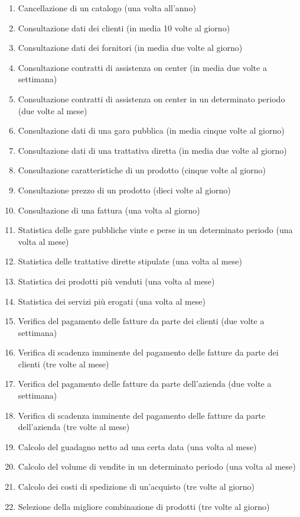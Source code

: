 \begin{enumerate}
  \item Cancellazione di un catalogo (una volta all'anno)
  \item Consultazione dati dei clienti (in media 10 volte al giorno)
  \item Consultazione dati dei fornitori (in media due volte al giorno)
  \item Consultazione contratti di assistenza on center (in media due volte a settimana)
  \item Consultazione contratti di assistenza on center in un determinato periodo (due volte al mese)
  \item Consultazione dati di una gara pubblica (in media cinque volte al giorno)
  \item Consultazione dati di una trattativa diretta (in media due volte al giorno)
  \item Consultazione caratteristiche di un prodotto (cinque volte al giorno)
  \item Consultazione prezzo di un prodotto (dieci volte al giorno)
  \item Consultazione di una fattura (una volta al giorno)
  \item Statistica delle gare pubbliche vinte e perse in un determinato periodo (una volta al mese)
  \item Statistica delle trattative dirette stipulate (una volta al mese)
  \item Statistica dei prodotti più venduti (una volta al mese)
  \item Statistica dei servizi più erogati (una volta al mese)
  \item Verifica del pagamento delle fatture da parte dei clienti (due volte a settimana)
  \item Verifica di scadenza imminente del pagamento delle fatture da parte dei clienti (tre volte al mese)
  \item Verifica del pagamento delle fatture da parte dell'azienda (due volte a settimana)
  \item Verifica di scadenza imminente del pagamento delle fatture da parte dell'azienda (tre volte al mese)
  \item Calcolo del guadagno netto ad una certa data (una volta al mese)
  \item Calcolo del volume di vendite in un determinato periodo (una volta al mese)
  \item Calcolo dei costi di spedizione di un'acquisto (tre volte al giorno)
  \item Selezione della migliore combinazione di prodotti (tre volte al giorno)

\end{enumerate}
